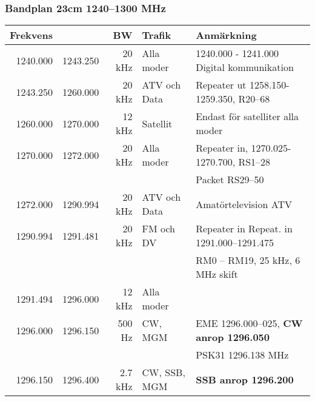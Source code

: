 \begin{landscape}
\subsubsection{Bandplan 23cm 1240--1300 MHz}
\begin{tabular}{rrrll}
	\textbf{Frekvens}         &               & \textbf{BW}   & \textbf{Trafik}     & \textbf{Anmärkning}                                          \\ \hline
	         1240.000         & 1243.250      & 20 kHz        & Alla moder          & 1240.000 - 1241.000 Digital kommunikation                    \\ \hline
	         1243.250         & 1260.000      & 20 kHz        & ATV och Data        & Repeater ut 1258.150-1259.350, R20--68                       \\ \hline
	         1260.000         & 1270.000      & 12 kHz        & Satellit            & Endast för satelliter alla moder                             \\ \hline
	         1270.000         & 1272.000      & 20 kHz        & Alla moder          & Repeater in, 1270.025-1270.700, RS1--28                      \\
                                  &               &               &                     & Packet RS29--50                                              \\ \hline
	         1272.000         & 1290.994      & 20 kHz        & ATV och Data        & Amatörtelevision ATV                                         \\ \hline
	         1290.994         & 1291.481      & 20 kHz        & FM och DV           & Repeater in Repeat. in 1291.000--1291.475                    \\
                                  &               &               &                     & RM0 – RM19, 25 kHz, 6 MHz skift                              \\ \hline
	         1291.494         & 1296.000      & 12 kHz        & Alla moder          & \\ \hline
	         1296.000         & 1296.150      & 500 Hz        & CW,  MGM            & EME 1296.000--025, \textbf{CW anrop 1296.050}                \\
                                  &               &               &                     & PSK31 1296.138 MHz                                           \\ \hline
	         1296.150         & 1296.400      & 2.7 kHz       & CW, SSB, MGM        & \textbf{SSB anrop 1296.200}                                  \\

\end{tabular}
\end{landscape}
